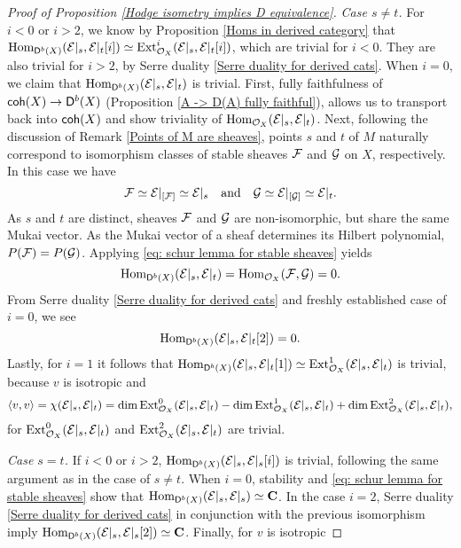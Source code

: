 \begin{proof}[Proof of Proposition \ref{Hodge isometry implies D equivalence}]
    \vspace{0.3cm}
    \noindent
    \textsl{Case $s \neq t$.}  
    For $i < 0$ or $i > 2$, we know by Proposition \ref{Homs in derived category} that $\operatorname{Hom}_{\mathsf{D}^b(X)}(\mathcal E|_s, \mathcal E|_t[i]) \simeq \operatorname{Ext}^i_{{\mathcal{O}_{X}}}(\mathcal E|_s, \mathcal E|_t[i])$, which are trivial for $i < 0$. They are also trivial for $i > 2$, by Serre duality \ref{Serre duality for derived cats}. When $i = 0$, we claim that $\operatorname{Hom}_{\mathsf{D}^b(X)}(\mathcal E|_s, \mathcal E|_t)$ is trivial. First, fully faithfulness of $\mathsf{coh}(X) \to \mathsf{D}^b(X)$ (\cf Proposition \ref{A -> D(A) fully faithful}), allows us to transport back into $\mathsf{coh}(X)$ and show triviality of $\operatorname{Hom}_{{\mathcal{O}_{X}}}(\mathcal E|_s, \mathcal E|_t)$. Next, following the discussion of Remark \ref{Points of M are sheaves}, points $s$ and $t$ of $M$ naturally correspond to isomorphism classes of stable sheaves $\mathcal F$ and $\mathcal G$ on $X$, respectively. In this case we have
    \[
        \mathcal F \simeq \mathcal E|_{[\mathcal F]} \simeq \mathcal E|_s \quad \text{and} \quad \mathcal G \simeq \mathcal E|_{[\mathcal G]} \simeq \mathcal E|_t.
    \]
    As $s$ and $t$ are distinct, sheaves $\mathcal F$ and $\mathcal G$ are non-isomorphic, but share the same Mukai vector. As the Mukai vector of a sheaf determines its Hilbert polynomial, $P(\mathcal F) = P(\mathcal G)$. Applying \eqref{eq: schur lemma for stable sheaves} yields 
    \[
        \operatorname{Hom}_{\mathsf{D}^b(X)}(\mathcal E|_s, \mathcal E|_t) = \operatorname{Hom}_{{\mathcal{O}_{X}}}(\mathcal F, \mathcal G)= 0. 
    \]
    From Serre duality \ref{Serre duality for derived cats} and freshly established case of $i = 0$, we see 
    \[
        \operatorname{Hom}_{\mathsf{D}^b(X)}(\mathcal E|_s, \mathcal E|_t[2]) = 0.
    \]
    Lastly, for $i = 1$ it follows that $\operatorname{Hom}_{\mathsf{D}^b(X)}(\mathcal E|_s, \mathcal E|_t[1]) \simeq \operatorname{Ext}^1_{\mathcal{O}_{X}}(\mathcal E|_s, \mathcal E|_t)$ is trivial, because $v$ is isotropic and 
    \[
        \langle v, v \rangle = \chi(\mathcal E|_s, \mathcal E|_t) = \dim\operatorname{Ext}^0_{\mathcal{O}_{X}}(\mathcal E|_s, \mathcal E|_t) - \dim\operatorname{Ext}^1_{\mathcal{O}_{X}}(\mathcal E|_s, \mathcal E|_t) + \dim\operatorname{Ext}^2_{\mathcal{O}_{X}}(\mathcal E|_s, \mathcal E|_t),
    \]
    for $\operatorname{Ext}^0_{\mathcal{O}_{X}}(\mathcal E|_s, \mathcal E|_t)$ and $\operatorname{Ext}^2_{\mathcal{O}_{X}}(\mathcal E|_s, \mathcal E|_t)$ are trivial.

    \vspace{0.3cm}
    \noindent
    \textsl{Case $s = t$.}
    If $i < 0$ or $i > 2$, $\operatorname{Hom}_{\mathsf{D}^b(X)}(\mathcal E|_s, \mathcal E|_s[i])$ is trivial, following the same argument as in the case of $s \neq t$. When $i = 0$, stability and \eqref{eq: schur lemma for stable sheaves} show that $\operatorname{Hom}_{\mathsf{D}^b(X)}(\mathcal E|_s, \mathcal E|_s) \simeq \mathbf C$. In the case $i = 2$, Serre duality \ref{Serre duality for derived cats} in conjunction with the previous isomorphism imply $\operatorname{Hom}_{\mathsf{D}^b(X)}(\mathcal E|_s, \mathcal E|_s[2]) \simeq \mathbf C$. Finally, for $v$ is isotropic 


\end{proof}

